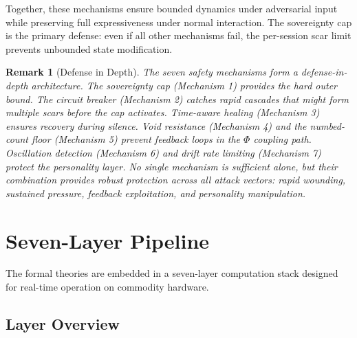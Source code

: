 \documentclass[11pt]{article}
\newtheorem{remark}[theorem]{Remark}
\begin{document}
Together, these mechanisms ensure bounded dynamics under adversarial input while preserving full expressiveness under normal interaction. The sovereignty cap is the primary defense: even if all other mechanisms fail, the per-session scar limit prevents unbounded state modification.

\begin{remark}[Defense in Depth]
The seven safety mechanisms form a defense-in-depth architecture. The sovereignty cap (Mechanism 1) provides the hard outer bound. The circuit breaker (Mechanism 2) catches rapid cascades that might form multiple scars before the cap activates. Time-aware healing (Mechanism 3) ensures recovery during silence. Void resistance (Mechanism 4) and the numbed-count floor (Mechanism 5) prevent feedback loops in the $\Phi$ coupling path. Oscillation detection (Mechanism 6) and drift rate limiting (Mechanism 7) protect the personality layer. No single mechanism is sufficient alone, but their combination provides robust protection across all attack vectors: rapid wounding, sustained pressure, feedback exploitation, and personality manipulation.
\end{remark}

\section{Seven-Layer Pipeline}
\label{sec:pipeline}

The formal theories are embedded in a seven-layer computation stack designed for real-time operation on commodity hardware.

\subsection{Layer Overview}
\end{document}
